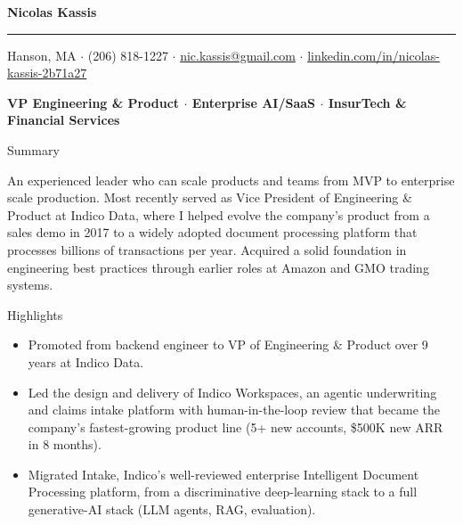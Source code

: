 \documentclass[10pt,oneside]{article}
\makeatletter
\newcommand{\name}{Nicolas Kassis}
\newcommand{\location}{Hanson, MA}
\newcommand{\phone}{(206) 818-1227}
\newcommand{\email}{nic.kassis@gmail.com}
\newcommand{\linkedinurl}{linkedin.com/in/nicolas-kassis-2b71a27}
\newcommand{\bigname}[1]{
  \begin{center}\fontfamily{phv}\selectfont\Huge\bfseries#1\end{center}
}
\newcommand{\headline}[1]{
  \begin{center}\fontfamily{phv}\selectfont\small\bfseries#1\end{center}
}
\newenvironment{ressection}[1]{
  \vspace{4pt}
  {\fontfamily{phv}\selectfont\Large#1}
  \begin{itemize}
    \vspace{3pt}
}{
  \end{itemize}
}
\newcommand{\ressubitem}[1]{
  \vspace{-1pt}
\item \begin{flushleft} #1 \end{flushleft}
}
\makeatother
\begin{document}
\bigname{\name}
\vspace{-8pt} \rule{\textwidth}{1pt}
\vspace{2pt}
\begin{center}
  {\small \location{} \; $\cdot$ \; \phone{} \; $\cdot$ \; \href{mailto:\email}{\email} \; $\cdot$ \; \href{https://\linkedinurl}{\linkedinurl}}
\end{center}
\headline{VP Engineering \& Product $\cdot$ Enterprise AI/SaaS $\cdot$ InsurTech \& Financial Services}
\vspace{6pt}

\vspace{4pt}
{\selectfont\Large Summary}
\vspace{3pt}

\begin{flushleft}
An experienced leader who can scale products and teams from MVP to enterprise scale production. Most recently served as Vice President of Engineering \& Product at Indico Data, where I helped evolve the company's product from a sales demo in 2017 to a widely adopted document processing platform that processes billions of transactions per year. Acquired a solid foundation in engineering best practices through earlier roles at Amazon and GMO trading systems.
\end{flushleft}

\begin{ressection}{Highlights}
  \ressubitem{Promoted from backend engineer to VP of Engineering \& Product over 9 years at Indico Data.}
  \ressubitem{Led the design and delivery of Indico Workspaces, an agentic underwriting and claims intake platform with human-in-the-loop review that became the company's fastest-growing product line (5+ new accounts, \$500K new ARR in 8 months).}
  \ressubitem{Migrated Intake, Indico's well-reviewed enterprise Intelligent Document Processing platform, from a discriminative deep-learning stack to a full generative-AI stack (LLM agents, RAG, evaluation).}
\end{ressection}
\end{document}
